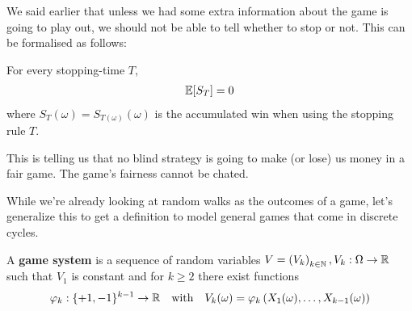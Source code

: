 We said earlier that unless we had some extra information about the game is going to play out, we should not be able to tell whether to stop or not.
This can be formalised as follows:
\begin{thm}[]
  For every stopping-time $T$,
  \begin{align*}
    \mathbb{E}[S_T] = 0
  \end{align*}
  where $S_T(\omega) = S_{T(\omega)}(\omega)$ is the accumulated win when using the stopping rule $T$.
\end{thm}
This is telling us that no blind strategy is going to make (or lose) us money in a fair game. The game's fairness cannot be chated.

While we're already looking at random walks as the outcomes of a game, let's generalize this to get a definition to model general games that come in discrete cycles.
\begin{dfn}[]
  A \textbf{game system} is a sequence of random variables $V = \left(V_{k}\right)_{k \in \mathbb{N}},V_k: \Omega \to \mathbb{R}$ such that $V_1$ is constant and for $k \geq 2$ there exist functions
  \begin{align*}
    \varphi_k: \{+1,-1\}^{k-1} \to  \mathbb{R} \quad \text{with} \quad V_k(\omega) = \varphi_k\left(
      X_1(\omega), \ldots, X_{k-1}(\omega)
    \right)
  \end{align*}
\end{dfn}
